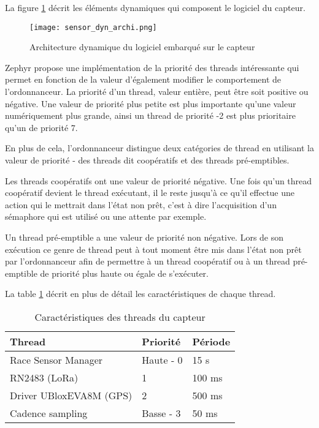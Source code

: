 La figure \ref{fig:sensor_dyn_archi} décrit les éléments dynamiques qui composent le logiciel du capteur.

\begin{figure}[htb]
\centering 
\texttt{[image: sensor\_dyn\_archi.png]} 
\caption{Architecture dynamique du logiciel embarqué sur le capteur}
\label{fig:sensor_dyn_archi}
\end{figure}

Zephyr propose une implémentation de la priorité des threads intéressante qui permet en fonction de la valeur d'également modifier le comportement de l'ordonnanceur. La priorité d'un thread, valeur entière, peut être soit positive ou négative. Une valeur de priorité plus petite est plus importante qu'une valeur numériquement plus grande, ainsi un thread de priorité -2 est plus prioritaire qu'un de priorité 7.

En plus de cela, l'ordonnanceur distingue deux catégories de thread en utilisant la valeur de priorité - des threads dit coopératifs et des threads pré-emptibles.

Les threads coopératifs ont une valeur de priorité négative. Une fois qu’un thread coopératif devient le thread exécutant, il le reste jusqu'à ce qu'il effectue une action qui le mettrait dans l'état non prêt, c'est à dire l'acquisition d'un sémaphore qui est utilisé ou une attente par exemple.

Un thread pré-emptible a une valeur de priorité non négative. Lors de son exécution ce genre de thread peut à tout moment être mis dans l'état non prêt par l'ordonnanceur afin de permettre à un thread coopératif ou à un thread pré-emptible de priorité plus haute ou égale de s'exécuter. \cite{zephyr_web}

La table \ref{tab:threads_cara} décrit en plus de détail les caractéristiques de chaque thread.

\begin{table}[htb]
\caption{Caractéristiques des threads du capteur}
\label{tab:threads_cara}
\centering
\begin{tabular}{ l l l }
\toprule
Thread & Priorité & Période \\
\midrule
Race Sensor Manager & Haute - 0 & 15 s  \\
RN2483 (LoRa) & 1 & 100 ms  \\
Driver UBloxEVA8M (GPS) & 2 & 500 ms  \\
Cadence sampling & Basse - 3 & 50 ms  \\
\bottomrule 
\end{tabular}
\end{table}

